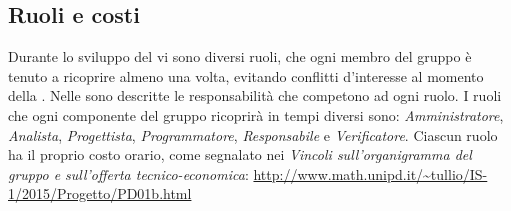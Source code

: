 \subsection{Ruoli e costi}
Durante lo sviluppo del  vi sono diversi ruoli, che ogni membro del gruppo è tenuto a ricoprire almeno una volta, evitando conflitti d’interesse al momento della . Nelle \NormeDiProgetto sono descritte le responsabilità che competono ad ogni ruolo. I ruoli che ogni componente del gruppo ricoprirà in tempi diversi sono: \textit{Amministratore}, \textit{Analista}, \textit{Progettista}, \textit{Programmatore}, \textit{Responsabile} e \textit{Verificatore}.
Ciascun ruolo ha il proprio costo orario, come segnalato nei \textit{Vincoli sull’organigramma del gruppo e sull’offerta tecnico-economica}:
\url{http://www.math.unipd.it/~tullio/IS-1/2015/Progetto/PD01b.html}



